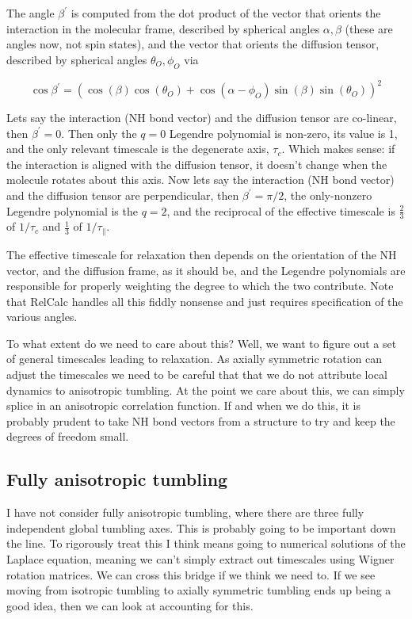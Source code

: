 \documentclass[showkeys,aps,prb,prepreint,amssymb, amsmath,nobibnotes]{article}
\begin{document}
The angle $\beta^\prime$ is computed from the dot product of the vector that orients the interaction in the molecular frame, described by spherical angles $\alpha,\beta$ (these are angles now, not spin states), and the vector that orients the diffusion tensor, described by spherical angles $\theta_O,\phi_O$ via

\begin{equation}
  \cos\beta^\prime=\left(\cos(\beta) \cos(\theta_O) + \cos(\alpha  -\phi_O) \sin(\beta) \sin(\theta_O)\right)^2
\end{equation}

Lets say the interaction (NH bond vector) and the diffusion tensor are co-linear, then $\beta^\prime=0$. Then only the $q=0$ Legendre polynomial is non-zero, its value is 1, and the only relevant timescale is the degenerate axis, $\tau_c$. Which makes sense: if the interaction is aligned with the diffusion tensor, it doesn't change when the molecule rotates about this axis. Now lets say the interaction (NH bond vector) and the diffusion tensor are perpendicular, then $\beta^\prime=\pi/2$, the only-nonzero Legendre polynomial is the $q=2$, and the reciprocal of the effective timescale is $\frac{2}{3}$ of $1/\tau_c$ and $\frac{1}{3}$ of $1/\tau_\parallel$.

The effective timescale for relaxation then depends on the orientation of the NH vector, and the diffusion frame, as it should be, and the Legendre polynomials are responsible for properly weighting the degree to which the two contribute. Note that RelCalc handles all this fiddly nonsense and just requires specification of the various angles.

To what extent do we need to care about this? Well, we want to figure out a set of general timescales leading to relaxation. As axially symmetric rotation can adjust the timescales we need to be careful that that we do not attribute local dynamics to anisotropic tumbling. At the point we care about this, we can simply splice in an anisotropic correlation function. If and when we do this, it is probably prudent to take NH bond vectors from a structure to try and keep the degrees of freedom small.

\subsection{Fully anisotropic tumbling}

I have not consider fully anisotropic tumbling, where there are three fully independent global tumbling axes. This is probably going to be important down the line. To rigorously treat this I think means going to numerical solutions of the Laplace equation, meaning we can't simply extract out timescales using Wigner rotation matrices. We can cross this bridge if we think we need to. If we see moving from isotropic tumbling to axially symmetric tumbling ends up being a good idea, then we can look at accounting for this.
\end{document}
